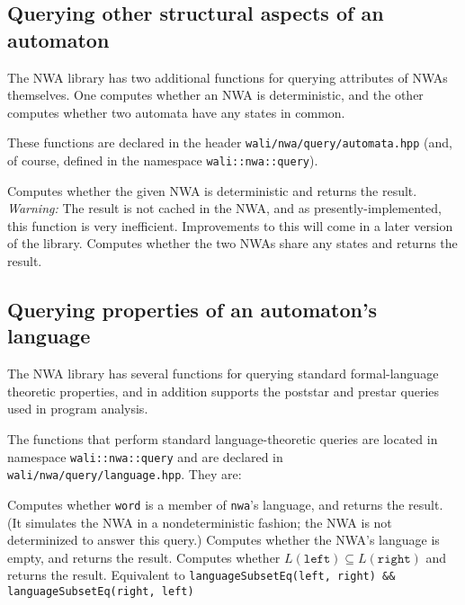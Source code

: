 \restoregeometry


\subsection{Querying other structural aspects of an automaton}
\label{Se:query-automaton}

The NWA library has two additional functions for querying attributes
of NWAs themselves. One computes whether an NWA is deterministic, and
the other computes whether two automata have any states in common.

These functions are declared in the header
\texttt{wali/nwa/query/automata.hpp} (and, of course, defined in the
namespace \texttt{wali::nwa::query}).

\begin{functionlist}
    Computes whether the given NWA is deterministic and returns the
    result. \textit{Warning:} The result is not cached in the NWA, and
    as presently-implemented, this function is very
    inefficient. Improvements to this will come in a later version of
    the library.
    Computes whether the two NWAs share any states and returns the
    result.
\end{functionlist}


\subsection{Querying properties of an automaton's language}
\label{Se:query-language}

The NWA library has several functions for querying standard
formal-language theoretic properties, and in addition supports
the poststar and prestar queries used in program analysis.

The functions that perform standard language-theoretic queries are
located in namespace \texttt{wali::nwa::query} and are declared in
\texttt{wali/nwa/query/language.hpp}. They are:
\begin{functionlist}
   Computes whether \texttt{word} is a member of
    \texttt{nwa}'s language, and returns the result. (It simulates the
    NWA in a nondeterministic fashion; the NWA is not determinized to answer
    this query.)
   Computes
    whether the NWA's language is empty, and returns the result.
    Computes whether $L(\texttt{left}) \subseteq L(\texttt{right})$
    and returns the result.
    Equivalent to \texttt{languageSubsetEq(left, right) \&\&
    languageSubsetEq(right, left)}
\end{functionlist}

